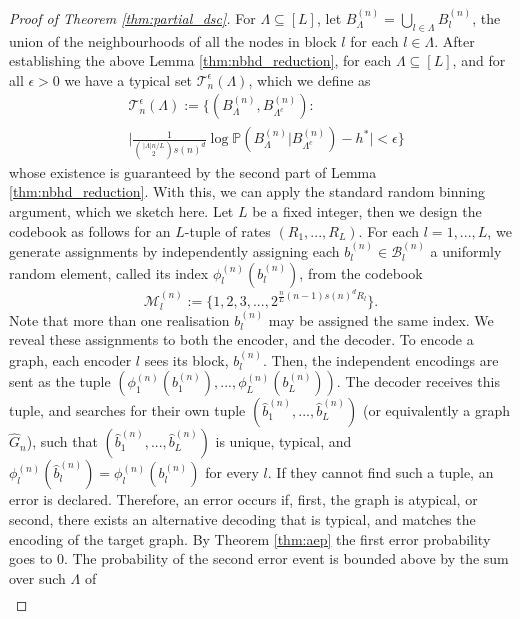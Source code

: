 \documentclass[conference,letterpaper]{IEEEtran}
\begin{document}
\begin{proof}[Proof of Theorem \ref{thm:partial_dsc}]
    For $\Lambda \subseteq [L]$, let $B_{\Lambda}^{(n)} = \bigcup_{l\in \Lambda} B_l^{(n)}$, the union of the neighbourhoods of all the nodes in block $l$ for each $l \in \Lambda$. After establishing the above Lemma \ref{thm:nbhd_reduction}, for each $\Lambda \subseteq [L]$, and for all $\epsilon > 0$ we have a typical set $\mathcal{T}_n^\epsilon(\Lambda)$, which we define as
    \begin{align}
        &\mathcal{T}_n^\epsilon(\Lambda) := \Big\{(B_\Lambda^{(n)},B_{\Lambda^c}^{(n)}) :\nonumber \\ &\Big| \frac{1}{{\binom{{|\Lambda|n}/{L}}{2} s\left(n\right)^d}}\log {\mathbb{P}(B_{\Lambda}^{(n)}|B_{\Lambda^c}^{(n)})} 
        -h^* \Big| < \epsilon\Big\}
    \end{align}
    whose existence is guaranteed by the second part of Lemma \ref{thm:nbhd_reduction}.
    With this, we can apply the standard random binning argument, which we sketch here. Let $L$ be a fixed integer, then we design the codebook as follows for an $L$-tuple of rates $(R_1,...,R_L)$. For each $l = 1,...,L$, we generate assignments by independently assigning each $b_l^{(n)} \in \mathcal{B}_l^{(n)}$ a uniformly random element, called its index $\phi_l^{(n)}(b_l^{(n)})$, from the codebook
    \begin{equation*}
        \mathcal{M}_l^{(n)} := \{1,2,3,...,2^{\frac{n}{L}(n-1)s(n)^dR_l}\}.
    \end{equation*}
    Note that more than one realisation $b_l^{(n)}$ may be assigned the same index. We reveal these assignments to both the encoder, and the decoder. To encode a graph, each encoder $l$ sees its block, $b_l^{(n)}$. Then, the independent encodings are sent as the tuple $(\phi_1^{(n)}(b_1^{(n)}),...,\phi_L^{(n)}(b_L^{(n)}))$. The decoder receives this tuple, and searches for their own tuple $(\hat{b}_1^{(n)},...,\hat{b}_L^{(n)})$ (or equivalently a graph $\hat{G}_n$), such that $(\hat{b}_1^{(n)},...,\hat{b}_L^{(n)})$ is unique, typical, and $\phi_l^{(n)}(\hat{b}_l^{(n)}) = \phi_l^{(n)}(b_l^{(n)})$ for every $l$. If they cannot find such a tuple, an error is declared. Therefore, an error occurs if, first, the graph is atypical, or second, there exists an alternative decoding that is typical, and matches the encoding of the target graph. By Theorem \ref{thm:aep} the first error probability goes to 0. The probability of the second error event is bounded above by the sum over such $\Lambda$ of
    \begin{align}

\end{align}
\end{proof}
\end{document}
